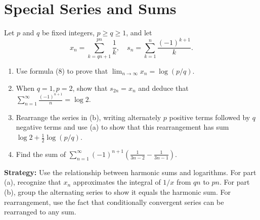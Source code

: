 \section{Special Series and Sums}



\begin{problembox}
Let \(p\) and \(q\) be fixed integers, \(p \geq q \geq 1\), and let
\[x_n = \sum_{k=qn+1}^{pn} \frac{1}{k}, \quad s_n = \sum_{k=1}^{n} \frac{(-1)^{k+1}}{k}.\]
\begin{enumerate}[label=\alph*)]
\item Use formula (8) to prove that \(\lim_{n \to \infty} x_n = \log(p/q)\).
\item When \(q = 1, p = 2\), show that \(s_{2n} = x_n\) and deduce that \(\sum_{n=1}^{\infty} \frac{(-1)^{n+1}}{n} = \log 2\).
\item Rearrange the series in (b), writing alternately \(p\) positive terms followed by \(q\) negative terms and use (a) to show that this rearrangement has sum \(\log 2 + \frac{1}{2} \log(p/q)\).
\item Find the sum of \(\sum_{n=1}^{\infty} (-1)^{n+1} \left( \frac{1}{3n - 2} - \frac{1}{3n - 1} \right)\).
\end{enumerate}
\end{problembox}

\noindent\textbf{Strategy:} Use the relationship between harmonic sums and logarithms. For part (a), recognize that \(x_n\) approximates the integral of \(1/x\) from \(qn\) to \(pn\). For part (b), group the alternating series to show it equals the harmonic sum. For rearrangement, use the fact that conditionally convergent series can be rearranged to any sum.

